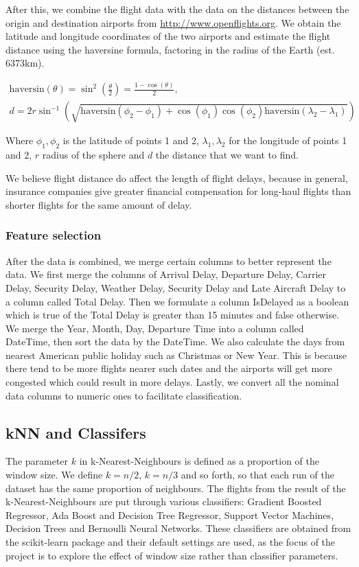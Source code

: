 \documentclass[letterpaper,11pt]{article}
\begin{document}
After this, we combine the flight data with the data on the distances between the origin and destination airports from \url{http://www.openflights.org}. We obtain the latitude and longitude coordinates of the two airports and estimate the flight distance using the haversine formula, factoring in the radius of the Earth (est. 6373km).

\begin{multline}
\scriptstyle \text{haversin}(\theta)=\sin^2\left(\frac\theta2\right)=\frac{1-\cos(\theta)}2, \\
\scriptstyle d=2r\sin^{-1}\left(\sqrt{\text{haversin}(\phi_2-\phi_1)+\cos(\phi_1)\cos(\phi_2)\text{haversin}(\lambda_2-\lambda_1)}\right)
\end{multline}

Where $\phi_1, \phi_2$ is the latitude of points 1 and 2, $\lambda_1, \lambda_2$ for the longitude of points 1 and 2, $r$ radius of the sphere and $d$ the distance that we want to find.

We believe flight distance do affect the length of flight delays, because in general, insurance companies give greater financial compensation for long-haul flights than shorter flights for the same amount of delay.

\subsubsection{Feature selection}
After the data is combined, we merge certain columns to better represent the data. We first merge the columns of Arrival Delay, Departure Delay, Carrier Delay, Security Delay, Weather Delay, Security Delay and Late Aircraft Delay to a column called Total Delay. Then we formulate a column IsDelayed as a boolean which is true of the Total Delay is greater than 15 minutes and false otherwise. We merge the Year, Month, Day, Departure Time into a column called DateTime, then sort the data by the DateTime. We also calculate the days from nearest American public holiday such as Christmas or New Year. This is because there tend to be more flights nearer such dates and the airports will get more congested which could result in more delays. Lastly, we convert all the nominal data columns to numeric ones to facilitate classification. 

\subsection{kNN and Classifers}
The parameter $k$ in k-Nearest-Neighbours is defined as a proportion of the window size. We define $k=n/2$, $k=n/3$ and so forth, so that each run of the dataset has the same proportion of neighbours. 	
The flights from the result of the k-Nearest-Neighbours are put through various classifiers: Gradient Boosted Regressor, Ada Boost and Decision Tree Regressor, Support Vector Machines, Decision Trees and Bernoulli Neural Networks. These classifiers are obtained from the scikit-learn package and their default settings are used, as the focus of the project is to explore the effect of window size rather than classifier parameters. 
\end{document}
